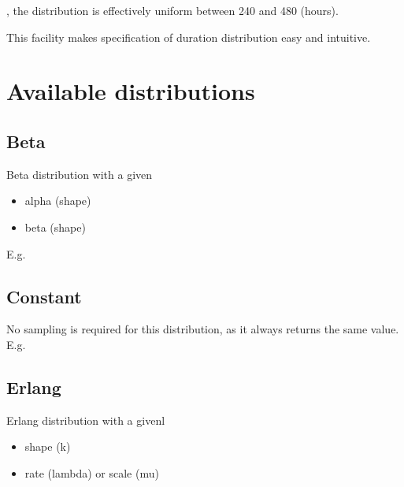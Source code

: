 \documentclass[letterpaper,10pt,english]{sphinxmanual}
\begin{document}
, the distribution is effectively uniform between 240 and 480 (hours).

This facility makes specification of duration distribution easy and intuitive.


\section{Available distributions}
\label{\detokenize{Distributions:available-distributions}}

\subsection{Beta}
\label{\detokenize{Distributions:beta}}
Beta distribution with a given
\begin{itemize}
\item {} 
alpha (shape)

\item {} 
beta (shape)

\end{itemize}

E.g.

%
\begin{sphinxVerbatim}[commandchars=\\\{\}]
    
\end{sphinxVerbatim}


\subsection{Constant}
\label{\detokenize{Distributions:constant}}
No sampling is required for this distribution, as it always returns the same value. E.g.

%
\begin{sphinxVerbatim}[commandchars=\\\{\}]
  
\end{sphinxVerbatim}


\subsection{Erlang}
\label{\detokenize{Distributions:erlang}}
Erlang distribution with a givenl
\begin{itemize}
\item {} 
shape (k)

\item {} 
rate (lambda) or scale (mu)

\end{itemize}
\end{document}
